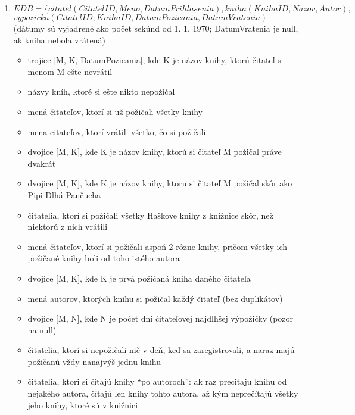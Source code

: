 \documentclass[10pt, a4paper]{article}
\theoremstyle{definition}
\begin{document}
\begin{enumerate}
\item $EDB = \{citatel(CitatelID, Meno, DatumPrihlasenia), kniha(KnihaID, Nazov, Autor),$\\
\hspace*{1cm}  $vypozicka(CitatelID, KnihaID, DatumPozicania, DatumVratenia)$\\
(dátumy sú vyjadrené ako počet sekúnd od 1. 1. 1970; DatumVratenia je null, ak kniha nebola vrátená)
\begin{itemize}
    \item trojice [M, K, DatumPozicania], kde K je názov knihy, ktorú čitateľ s menom M ešte nevrátil
    \item názvy kníh, ktoré si ešte nikto nepožičal
    \item mená čitateľov, ktorí si už požičali všetky knihy
    \item mena citateľov, ktorí vrátili všetko, čo si požičali
    \item dvojice [M, K], kde K je názov knihy, ktorú si čitateľ M požičal práve dvakrát
    \item dvojice [M, K], kde K je názov knihy, ktoru si čitateľ M požičal skôr ako Pipi Dlhá Pančucha
    \item čitatelia, ktorí si požičali všetky Haškove knihy z knižnice skôr, než niektorú z nich vrátili
    \item mená čitateľov, ktorí si požičali aspoň 2 rôzne knihy, pričom všetky ich požičané knihy boli od toho istého autora
    \item dvojice [M, K], kde K je prvá požičaná kniha daného čitateľa
    \item mená autorov, ktorých knihu si požičal každý čitateľ (bez duplikátov)
    \item dvojice [M, N], kde N je počet dní čitateľovej najdlhšej výpožičky (pozor na null)
    \item čitatelia, ktorí si nepožičali nič v deň, keď sa zaregistrovali, a naraz majú požičanú vždy nanajvýš jednu knihu
    \item čitatelia, ktori si čítajú knihy \enquote{po autoroch}: ak raz precitaju knihu od nejakého autora, čítajú len knihy tohto autora, až kým neprečítajú všetky jeho knihy, ktoré sú v knižnici
\end{itemize}




\end{enumerate}
\end{document}
